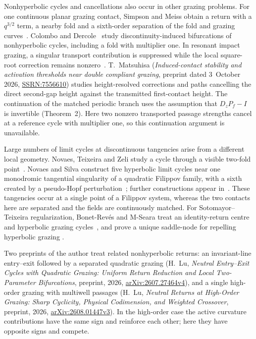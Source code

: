 Nonhyperbolic cycles and cancellations also occur in other grazing problems.
For one continuous planar grazing contact, Simpson and Meiss obtain a return
with a $q^{3/2}$ term, a nearby fold and a sixth-order separation of the fold
and grazing curves~\cite[Theorem~1]{simpsonmeiss2008}. Colombo and
Dercole~\cite{colombodercole2010} study discontinuity-induced bifurcations of
nonhyperbolic cycles, including a fold with multiplier one. In resonant impact
grazing, a singular transport contribution is suppressed while the local
square-root correction remains nonzero~\cite[Theorems~2.4--2.5]{simpsonghosh2026}.
T.~Matsuhisa (\emph{Induced-contact stability and activation thresholds near
double compliant grazing}, preprint dated 3~October 2026,
\href{https://doi.org/10.2139/ssrn.7556610}{SSRN:7556610}) studies
height-resolved corrections and paths cancelling the direct second-gap height
against the transmitted first-contact height. The continuation of the matched
periodic branch uses the assumption that $D_zP_f-I$ is invertible (Theorem~2).
Here two nonzero transported passage strengths cancel at a reference cycle
with multiplier one, so this continuation argument is unavailable.

Large numbers of limit cycles at discontinuous tangencies arise from a
different local geometry. Novaes, Teixeira and Zeli study a cycle through a
visible two-fold point~\cite{novaesteixeirazeli2018}. Novaes and Silva
construct five hyperbolic limit cycles near one monodromic tangential
singularity of a quadratic Filippov family, with a sixth created by a
pseudo-Hopf perturbation~\cite[Example~3 and Remark~1]{novaessilva2021}; further constructions appear
in~\cite{novaessilva2025}. These tangencies occur at a single point of a
Filippov system, whereas the two contacts here are separated and the fields
are continuously matched. For Sotomayor--Teixeira regularization,
Bonet-Rev\'es and M-Seara treat an identity-return centre and hyperbolic
grazing cycles~\cite[Theorems~2.3--2.4]{bonetseara2016}, and prove a unique
saddle-node for repelling hyperbolic grazing
\cite[Theorems~2.4 and~2.10]{bonetseara2022}.

Two preprints of the author treat related nonhyperbolic returns: an
invariant-line entry--exit followed by a separated quadratic grazing
(H.~Lu, \emph{Neutral Entry--Exit Cycles with Quadratic Grazing: Uniform
Return Reduction and Local Two-Parameter Bifurcations}, preprint, 2026,
\href{https://arxiv.org/abs/2607.27464v4}{arXiv:2607.27464v4}), and a single
high-order grazing with multiwell passages (H.~Lu, \emph{Neutral Returns at
High-Order Grazing: Sharp Cyclicity, Physical Codimension, and Weighted
Crossover}, preprint, 2026,
\href{https://arxiv.org/abs/2608.01447v3}{arXiv:2608.01447v3}). In the
high-order case the active curvature contributions have the same sign and
reinforce each other; here they have opposite signs and compete.

